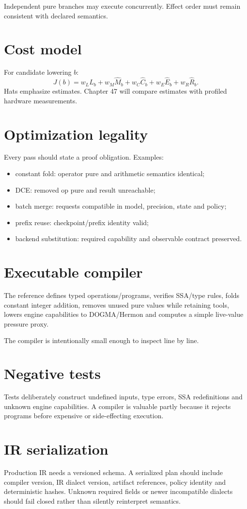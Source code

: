 Independent pure branches may execute concurrently. Effect order must remain consistent with declared semantics.

\section{Cost model}
For candidate lowering $b$:
\[
J(b)=w_L\hat L_b+w_M\hat M_b+w_C\hat C_b+w_E\hat E_b+w_R\hat R_b.
\]
Hats emphasize estimates. Chapter 47 will compare estimates with profiled hardware measurements.

\section{Optimization legality}
Every pass should state a proof obligation. Examples:
\begin{itemize}
\item constant fold: operator pure and arithmetic semantics identical;
\item DCE: removed op pure and result unreachable;
\item batch merge: requests compatible in model, precision, state and policy;
\item prefix reuse: checkpoint/prefix identity valid;
\item backend substitution: required capability and observable contract preserved.
\end{itemize}

\section{Executable compiler}
The reference defines typed operations/programs, verifies SSA/type rules, folds constant integer addition, removes unused pure values while retaining tools, lowers engine capabilities to DOGMA/Hermon and computes a simple live-value pressure proxy.

The compiler is intentionally small enough to inspect line by line.

\section{Negative tests}
Tests deliberately construct undefined inputs, type errors, SSA redefinitions and unknown engine capabilities. A compiler is valuable partly because it rejects programs before expensive or side-effecting execution.

\section{IR serialization}
Production IR needs a versioned schema. A serialized plan should include compiler version, IR dialect version, artifact references, policy identity and deterministic hashes. Unknown required fields or newer incompatible dialects should fail closed rather than silently reinterpret semantics.

